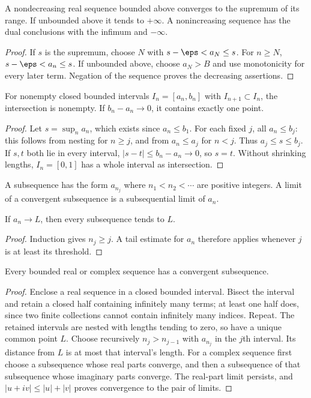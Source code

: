 \begin{theorem}
A nondecreasing real sequence bounded above converges to the supremum of its range. If unbounded above it tends to $+\infty$. A nonincreasing sequence has the dual conclusions with the infimum and $-\infty$.
\end{theorem}
\begin{proof}
If $s$ is the supremum, choose $N$ with $s-\eps<a_N\le s$. For $n\ge N$, $s-\eps<a_n\le s$. If unbounded above, choose $a_N>B$ and use monotonicity for every later term. Negation of the sequence proves the decreasing assertions.
\end{proof}

\begin{theorem}
For nonempty closed bounded intervals $I_n=[a_n,b_n]$ with $I_{n+1}\subset I_n$, the intersection is nonempty. If $b_n-a_n\to0$, it contains exactly one point.
\end{theorem}
\begin{proof}
Let $s=\sup_n a_n$, which exists since $a_n\le b_1$. For each fixed $j$, all $a_n\le b_j$: this follows from nesting for $n\ge j$, and from $a_n\le a_j$ for $n<j$. Thus $a_j\le s\le b_j$. If $s,t$ both lie in every interval, $|s-t|\le b_n-a_n\to0$, so $s=t$. Without shrinking lengths, $I_n=[0,1]$ has a whole interval as intersection.
\end{proof}

\begin{definition}
A subsequence has the form $a_{n_j}$ where $n_1<n_2<\cdots$ are positive integers. A limit of a convergent subsequence is a subsequential limit of $a_n$.
\end{definition}
\begin{proposition}
If $a_n\to L$, then every subsequence tends to $L$.
\end{proposition}
\begin{proof}
Induction gives $n_j\ge j$. A tail estimate for $a_n$ therefore applies whenever $j$ is at least its threshold.
\end{proof}

\begin{theorem}
Every bounded real or complex sequence has a convergent subsequence.
\end{theorem}
\begin{proof}
Enclose a real sequence in a closed bounded interval. Bisect the interval and retain a closed half containing infinitely many terms; at least one half does, since two finite collections cannot contain infinitely many indices. Repeat. The retained intervals are nested with lengths tending to zero, so have a unique common point $L$. Choose recursively $n_j>n_{j-1}$ with $a_{n_j}$ in the $j$th interval. Its distance from $L$ is at most that interval's length. For a complex sequence first choose a subsequence whose real parts converge, and then a subsequence of that subsequence whose imaginary parts converge. The real-part limit persists, and $|u+iv|\le |u|+|v|$ proves convergence to the pair of limits.
\end{proof}

